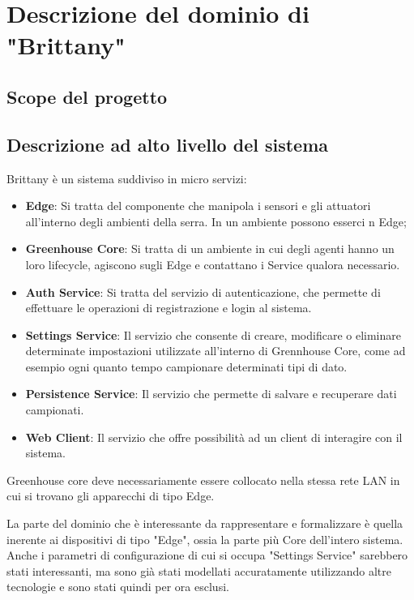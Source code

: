 \section{Descrizione del dominio di "Brittany"}

\subsection{Scope del progetto}

\subsection{Descrizione ad alto livello del sistema}
Brittany è un sistema suddiviso in micro servizi:
\begin{itemize}
	\item \textbf{Edge}: Si tratta del componente che manipola i sensori e gli attuatori all’interno degli ambienti della serra. In un ambiente possono esserci n Edge;
	\item \textbf{Greenhouse Core}: Si tratta di un ambiente in cui degli agenti hanno un loro lifecycle, agiscono sugli Edge e contattano i Service qualora necessario.
	\item \textbf{Auth Service}: Si tratta del servizio di autenticazione, che permette di effettuare le operazioni di registrazione e login al sistema.
	\item \textbf{Settings Service}: Il servizio che consente di creare, modificare o eliminare determinate impostazioni utilizzate all’interno di Grennhouse Core, come ad esempio ogni quanto tempo campionare determinati tipi di dato.
	\item \textbf{Persistence Service}: Il servizio che permette di salvare e recuperare dati campionati.
	\item \textbf{Web Client}: Il servizio che offre possibilità ad un client di interagire con il sistema.
\end{itemize}
Greenhouse core deve necessariamente essere collocato nella stessa rete LAN in cui si trovano gli apparecchi di tipo Edge.


\noindent La parte del dominio che è interessante da rappresentare e formalizzare è quella inerente ai dispositivi di tipo "Edge", ossia la parte più Core dell'intero sistema. \newline
Anche i parametri di configurazione di cui si occupa "Settings Service" sarebbero stati interessanti, ma sono già stati modellati accuratamente utilizzando altre tecnologie e sono stati quindi per ora esclusi.




